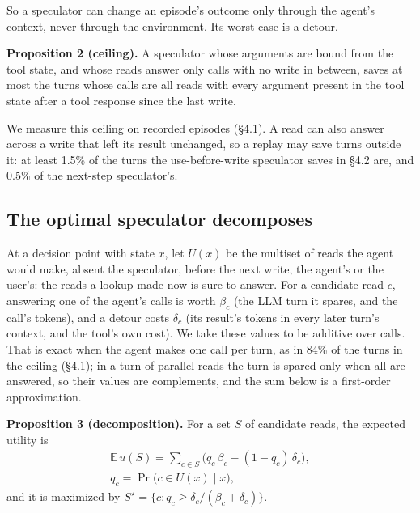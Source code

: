 \documentclass[10pt,twocolumn,letterpaper]{article}
\newcommand{\runin}[1]{{\sffamily\bfseries\color{accent}#1}}
\begin{document}
So a speculator can change an episode's outcome only through the agent's context, never through the environment. Its worst case is a detour.

\begin{prop}
\runin{Proposition 2 (ceiling).} A speculator whose arguments are bound from the tool state, and whose reads answer only calls with no write in between, saves at most the turns whose calls are all reads with every argument present in the tool state after a tool response since the last write.
\end{prop}

We measure this ceiling on recorded episodes (§4.1). A read can also answer across a write that left its result unchanged, so a replay may save turns outside it: at least 1.5\% of the turns the use-before-write speculator saves in §4.2 are, and 0.5\% of the next-step speculator's.

\subsection{The optimal speculator decomposes}\label{the-optimal-speculator-decomposes}

At a decision point with state \(x\), let \(U(x)\) be the multiset of reads the agent would make, absent the speculator, before the next write, the agent's or the user's: the reads a lookup made now is sure to answer. For a candidate read \(c\), answering one of the agent's calls is worth \(\beta_c\) (the LLM turn it spares, and the call's tokens), and a detour costs \(\delta_c\) (its result's tokens in every later turn's context, and the tool's own cost). We take these values to be additive over calls. That is exact when the agent makes one call per turn, as in 84\% of the turns in the ceiling (§4.1); in a turn of parallel reads the turn is spared only when all are answered, so their values are complements, and the sum below is a first-order approximation.

\begin{prop}
\runin{Proposition 3 (decomposition).} For a set \(S\) of candidate reads, the expected utility is \begin{gather*}\mathbb E\,u(S) = \sum_{c \in S} \big(q_c\,\beta_c - (1-q_c)\,\delta_c\big),\\ q_c = \Pr\big(c \in U(x) \mid x\big),\end{gather*} and it is maximized by \(S^\star = \{c : q_c \ge \delta_c / (\beta_c + \delta_c)\}\).
\end{prop}
\end{document}
